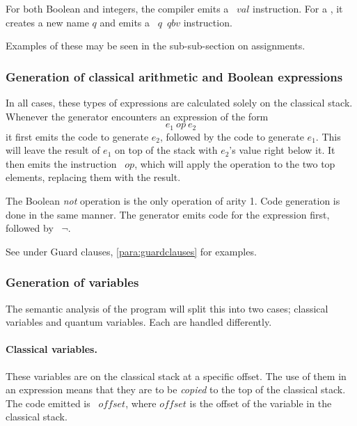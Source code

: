 For both Boolean and integers, the compiler emits a ~$val$ 
instruction. For a \qbit, it creates a new name $q$ and emits
a ~$q$~$qbv$ instruction.

Examples of these may be seen in the sub-sub-section on assignments.

\subsubsection{Generation of classical arithmetic and Boolean expressions}
In all cases, these types of expressions are calculated solely on 
the classical stack. Whenever the generator encounters 
 an expression of the form
\[ e_1\ op\ e_2\]
it first emits the code to generate $e_2$, followed by the code to generate
$e_1$. This will leave the result of $e_1$ on top of the stack with $e_2$'s
value right below it. 
It then emits the instruction ~$op$, which will
apply the operation to the two top elements, replacing them with the
result.

The Boolean \emph{not} operation is the only operation of arity 1. 
Code generation is done in the same manner. The generator emits code for the 
expression first, followed by ~$\neg$.

 See  under Guard clauses, \vref{para:guardclauses} for
examples.

\subsubsection{Generation of variables}
The semantic analysis of the program will split this into two cases; 
classical variables and quantum variables. Each are handled differently.

\paragraph{Classical variables.} These variables are on the classical
stack at a specific offset. The use of them in an expression means 
that they are to be \emph{copied} to the top of the classical stack.
The code emitted is ~$offset$, where $offset$ is the 
offset of the variable in the classical stack.

